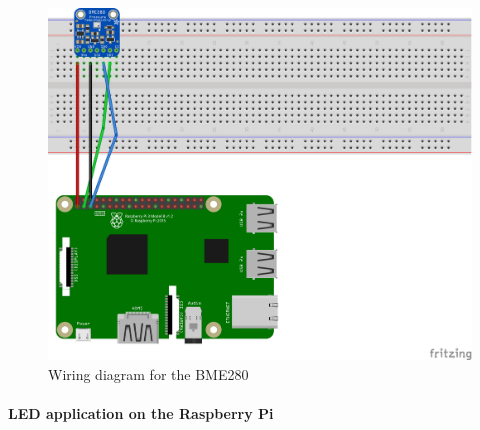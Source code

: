 \documentclass[a4paper]{article}
\begin{document}
			\begin{figure}[!htb]
				\centering
				\includegraphics[width=.8\textwidth]{img/raspberry_bme280_wiring.png}
				\caption{Wiring diagram for the BME280}
				\label{fig:wiringbme280}
			\end{figure}
			
			\newpage
			
			\paragraph{LED application on the Raspberry Pi}
				
\end{document}
